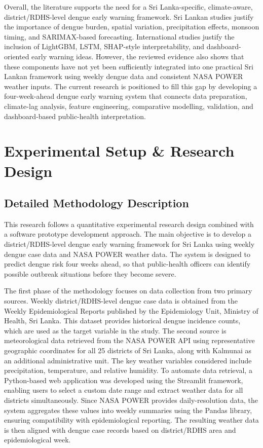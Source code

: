 \documentclass[12pt,a4paper]{article}
\begin{document}
Overall, the literature supports the need for a Sri Lanka-specific, climate-aware, district/RDHS-level dengue early warning framework. Sri Lankan studies justify the importance of dengue burden, spatial variation, precipitation effects, monsoon timing, and SARIMAX-based forecasting. International studies justify the inclusion of LightGBM, LSTM, SHAP-style interpretability, and dashboard-oriented early warning ideas. However, the reviewed evidence also shows that these components have not yet been sufficiently integrated into one practical Sri Lankan framework using weekly dengue data and consistent NASA POWER weather inputs. The current research is positioned to fill this gap by developing a four-week-ahead dengue early warning system that connects data preparation, climate-lag analysis, feature engineering, comparative modelling, validation, and dashboard-based public-health interpretation.





\clearpage
\section{Experimental Setup \& Research Design}
\label{sec:experimental_setup}

\subsection{Detailed Methodology Description}

This research follows a quantitative experimental research design combined with a software prototype development approach. The main objective is to develop a district/RDHS-level dengue early warning framework for Sri Lanka using weekly dengue case data and NASA POWER weather data. The system is designed to predict dengue risk four weeks ahead, so that public-health officers can identify possible outbreak situations before they become severe.

The first phase of the methodology focuses on data collection from two primary sources. Weekly district/RDHS-level dengue case data is obtained from the Weekly Epidemiological Reports published by the Epidemiology Unit, Ministry of Health, Sri Lanka. This dataset provides historical dengue incidence counts, which are used as the target variable in the study. The second source is meteorological data retrieved from the NASA POWER API using representative geographic coordinates for all 25 districts of Sri Lanka, along with Kalmunai as an additional administrative unit. The key weather variables considered include precipitation, temperature, and relative humidity. To automate data retrieval, a Python-based web application was developed using the Streamlit framework, enabling users to select a custom date range and extract weather data for all districts simultaneously. Since NASA POWER provides daily-resolution data, the system aggregates these values into weekly summaries using the Pandas library, ensuring compatibility with epidemiological reporting. The resulting weather data is then aligned with dengue case records based on district/RDHS area and epidemiological week.
\end{document}
